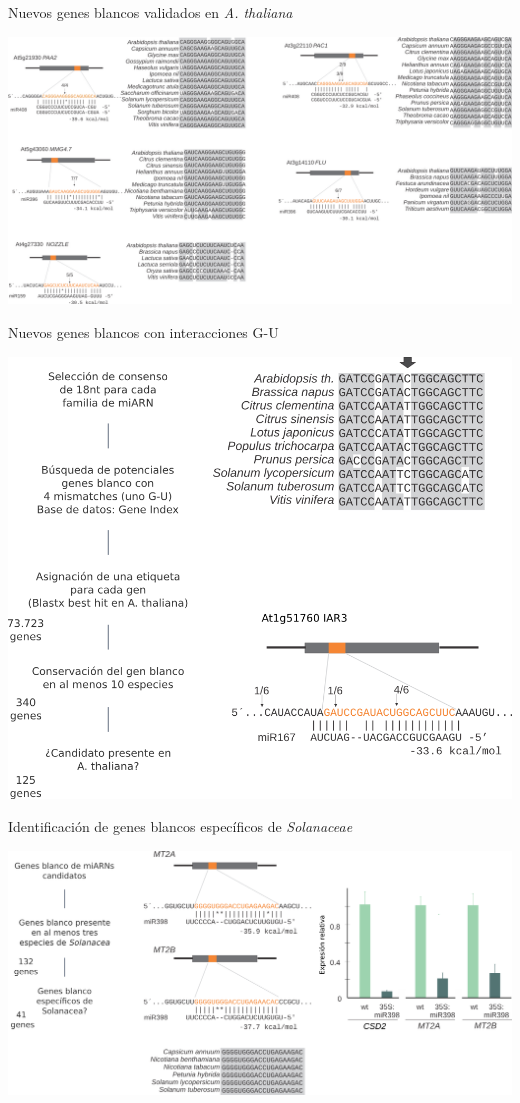 \documentclass{beamer}
\begin{document}
\begin{frame}{Nuevos genes blancos validados en \textit{A. thaliana}}
	\begin{center}
		\includegraphics[width=1\textwidth]{img/Figure4_retocada.png}
	\end{center}
\end{frame}

\begin{frame}{Nuevos genes blancos con interacciones G-U}
	\begin{center}
		\includegraphics[width=.6\textwidth]{img/Figure5_retocada.png}
	\end{center}
\end{frame}

\begin{frame}{Identificación de genes blancos específicos de \textit{Solanaceae}}
	\begin{center}
		\includegraphics[width=.8\textwidth]{img/Figure6_retocada.png}
	\end{center}
\end{frame}
\end{document}
